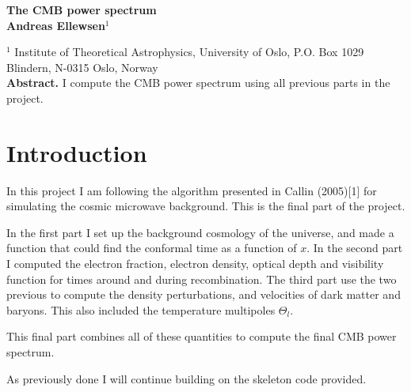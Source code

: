 \documentclass[a4paper]{report}
\begin{document}
  

\vspace*{4ex}

\begin{center}
  {\Large \bf The CMB power spectrum}\\[4ex]
  {\large \bf Andreas Ellewsen$^1$}\\[4ex]
  \begin{minipage}[t]{15cm}
        $^1$ Institute of Theoretical Astrophysics, University of Oslo, P.O. Box 1029 Blindern, N-0315 Oslo, Norway\\

    {\bf Abstract.} I compute the CMB power spectrum using all previous parts in the project. 
    
  \vspace*{2ex}
  \end{minipage}
\end{center}
\section{Introduction}\label{sec:introduction}
In this project I am following the algorithm presented in Callin (2005)[1] for simulating the cosmic microwave background.  
This is the final part of the project.

In the first part I set up the background cosmology of the universe, and made a function that could find the conformal time as a function of $x$. In the second part I computed the electron fraction, electron density, optical depth and visibility function for times around and during recombination. The third part use the two previous to compute the density perturbations, and velocities of dark matter and baryons. This also included the temperature multipoles $\Theta_l$.

This final part combines all of these quantities to compute the final CMB power spectrum.

As previously done I will continue building on the skeleton code provided.

\end{document}
